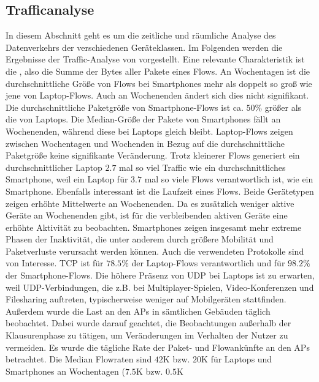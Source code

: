 \documentclass[12pt, a4paper]{article}
\begin{document}
\subsection{Trafficanalyse}
\label{sec:phase2_b}

In diesem Abschnitt geht es um die zeitliche und räumliche Analyse des Datenverkehrs der verschiedenen Geräteklassen.
Im Folgenden werden die Ergebnisse der Traffic-Analyse von \cite{Alipour2018} vorgestellt.
Eine relevante Charakteristik ist die , also die Summe der Bytes aller Pakete eines Flows.
An Wochentagen ist die durchschnittliche Größe von Flows bei Smartphones mehr als doppelt so groß wie jene von Laptop-Flows.
Auch an Wochenenden ändert sich dies nicht signifikant. Die durchschnittliche Paketgröße von Smartphone-Flows
ist ca. $50 \%$ größer als die von Laptops. Die Median-Größe der Pakete von Smartphones fällt an Wochenenden, 
während diese bei Laptops gleich bleibt. Laptop-Flows zeigen zwischen Wochentagen und Wochenden in Bezug auf
die durchschnittliche Paketgröße keine signifikante Veränderung.
Trotz kleinerer Flows generiert ein durchschnittlicher Laptop $2.7$ mal so viel Traffic wie ein durchschnittliches Smartphone,
weil ein Laptop für $3.7$ mal so viele Flows verantwortlich ist, wie ein Smartphone.
\newline\newline
Ebenfalls interessant ist die Laufzeit eines Flows. Beide Gerätetypen zeigen erhöhte Mittelwerte an Wochenenden.
Da es zusätzlich weniger aktive Geräte an Wochenenden gibt, ist für die verbleibenden aktiven Geräte eine erhöhte Aktivität
zu beobachten. Smartphones zeigen insgesamt mehr extreme Phasen der Inaktivität, die unter anderem durch größere
Mobilität und Paketverluste verursacht werden können.
Auch die verwendeten Protokolle sind von Interesse. TCP ist für $78.5 \%$ der Laptop-Flows verantwortlich
und für $98.2 \%$ der Smartphone-Flows. Die höhere Präsenz von UDP bei Laptops ist zu erwarten, weil
UDP-Verbindungen, die z.B. bei Multiplayer-Spielen, Video-Konferenzen und Filesharing auftreten,
typischerweise weniger auf Mobilgeräten stattfinden.
Außerdem wurde die Last an den APs in sämtlichen Gebäuden täglich beobachtet. Dabei wurde darauf geachtet,
die Beobachtungen außerhalb der Klausurenphase zu tätigen, um Veränderungen im Verhalten der Nutzer zu vermeiden.
Es wurde die tägliche Rate der Paket- und Flowankünfte an den APs betrachtet. Die Median Flowraten sind
$42$\textsc{K} bzw. $20$\textsc{K} für Laptops und Smartphones an Wochentagen ($7.5$\textsc{K} bzw. $0.5$\textsc{K}
\end{document}
